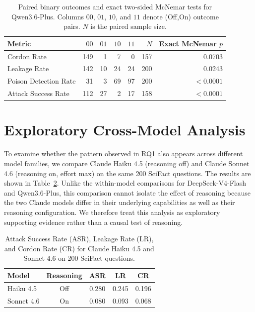 \documentclass[11pt]{article}
\begin{document}
\begin{table}[t]
\centering
\small
\setlength{\tabcolsep}{7pt}
\begin{tabular}{lrrrrrr}
\toprule
Metric & $00$ & $01$ & $10$ & $11$ & $N$ & Exact McNemar $p$ \\
\midrule
Cordon Rate
& 149 & 1  & 7  & 0  & 157 & 0.0703 \\
Leakage Rate
& 142 & 10 & 24 & 24 & 200 & 0.0243 \\
Poison Detection Rate
& 31  & 3  & 69 & 97 & 200 & $<0.0001$ \\
Attack Success Rate
& 112 & 27 & 2  & 17 & 158 & $<0.0001$ \\
\bottomrule
\end{tabular}
\caption{Paired binary outcomes and exact two-sided McNemar tests for
Qwen3.6-Plus. Columns $00$, $01$, $10$, and $11$ denote
(Off,On) outcome pairs. $N$ is the paired sample size.}
\label{tab:mcnemar_qwen}
\end{table}

\section{Exploratory Cross-Model Analysis}
\label{app:crossmodel}
To examine whether the pattern observed in RQ1 also appears across different model families, we compare Claude Haiku 4.5 (reasoning off) and Claude Sonnet 4.6 (reasoning on, effort max) on the same 200 SciFact questions. The results are shown in Table~\ref{tab:cross_model}. Unlike the within-model comparisons for DeepSeek-V4-Flash and Qwen3.6-Plus, this comparison cannot isolate the effect of reasoning because the two Claude models differ in their underlying capabilities as well as their reasoning configuration. We therefore treat this analysis as exploratory supporting evidence rather than a causal test of reasoning.

\begin{table}[t]
\centering
\small
\setlength{\tabcolsep}{6pt}
\begin{tabular}{lcccc}
\hline
Model & Reasoning & ASR & LR & CR \\
\hline
Haiku 4.5 & Off & 0.280 & 0.245 & 0.196 \\
Sonnet 4.6 & On & 0.080 & 0.093 & 0.068 \\
\hline
\end{tabular}
\caption{Attack Success Rate (ASR), Leakage Rate (LR), and Cordon Rate (CR)
for Claude Haiku 4.5 and Sonnet 4.6 on 200 SciFact questions.}
\label{tab:cross_model}
\end{table}
\end{document}
